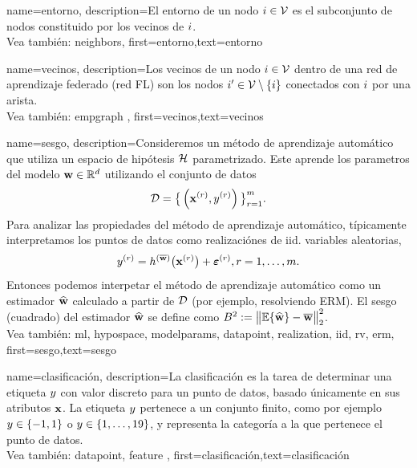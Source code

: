 {
	name={entorno},
	description={El entorno de un nodo $i \in \mathcal{V}$ es 
	el subconjunto de nodos constituido por los vecinos de $i$.
	\\
		Vea también: \gls{neighbors}},
	first={entorno},text={entorno} 
}

{
	name={vecinos},
	description={Los vecinos de un nodo $i \in \mathcal{V}$ 
	dentro de una red de aprendizaje federado (red FL) son los nodos $i' \in \mathcal{V} \setminus \{ i\}$ conectados con $i$ por una arista.
	\\
	Vea también: \gls{empgraph} },
	first={vecinos},text={vecinos} 
}

{
	name={sesgo},
	description={Consideremos un método de aprendizaje automático que utiliza un espacio de hipótesis $\mathcal{H}$ parametrizado. 
		Este aprende los parametros del modelo ${\bf w} \in \mathbb{R}^{d}$ utilizando el conjunto de datos $$ \mathcal{D}=\big\{ \left( {\bf x}^{(r)},y^{(r)} \right) \big\}_{r=1}^{m}.$$ 
		Para analizar las propiedades del método de aprendizaje automático, típicamente interpretamos los puntos de datos como realizaciónes
		de iid. variables aleatorias, $$ y^{(r)} = h^{(\overline{{\bf w}})}\big( {\bf x}^{(r)} \big) + \bm{\varepsilon}^{(r)}, r=1,\ldots,m.$$ 
		Entonces podemos interpetar el método de aprendizaje automático como un estimador $\widehat{{\bf w}}$ 
		calculado a partir de $\mathcal{D}$ (por ejemplo, resolviendo ERM). El sesgo (cuadrado) del estimador $\widehat{{\bf w}}$ 
		se define como $B^{2} := \big\| \mathbb{E} \{ \widehat{{\bf w}}  \}- \overline{{\bf w}}\big\|_{2}^{2}$. 
		\\
		Vea también: \gls{ml}, \gls{hypospace}, \glspl{modelparam}, \gls{datapoint}, \gls{realization}, \gls{iid}, \gls{rv}, \gls{erm}},
		first={sesgo},text={sesgo} 
}

{name={clasificación},
description={La clasificación es la tarea de determinar una
	etiqueta $y$  con valor discreto para un punto de datos, basado únicamente en sus 
	atributos ${\bf x}$. La etiqueta $y$ pertenece a un conjunto finito, como por ejemplo 
	$y \in \{-1,1\}$ o $y \in \{1,\ldots,19\}$, y representa la 
	categoría a la que pertenece el punto de datos.
	\\
		Vea también: \gls{datapoint}, \gls{feature} },
	first={clasificación},text={clasificación} 
}


